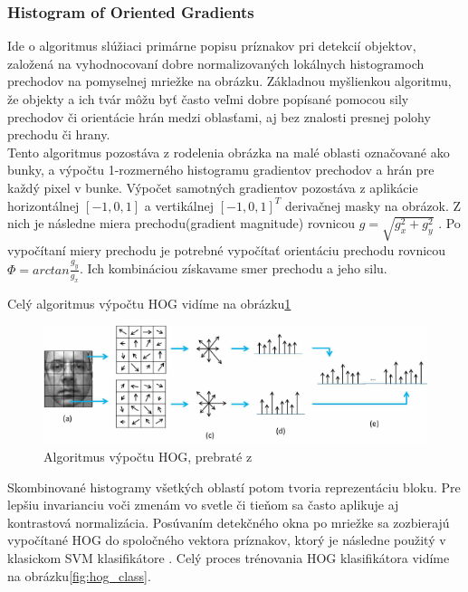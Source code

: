 \subsubsection{Histogram of Oriented Gradients}
Ide o algoritmus slúžiaci primárne popisu príznakov pri detekcií objektov, založená na vyhodnocovaní dobre normalizovaných lokálnych histogramoch prechodov na pomyselnej mriežke na obrázku.
Základnou myšlienkou algoritmu, že objekty a ich tvár môžu byť často veľmi dobre popísané pomocou sily prechodov či orientácie hrán medzi oblasťami, aj bez znalosti presnej polohy prechodu či hrany.\cite{dalal2005histograms} \\


\indent Tento algoritmus pozostáva z rodelenia obrázka na malé oblasti označované ako bunky, a výpočtu 1-rozmerného histogramu gradientov prechodov a hrán pre každý pixel v bunke\cite{dalal2005histograms}.
Výpočet samotných gradientov pozostáva z aplikácie horizontálnej $ [-1, 0, 1] $ a vertikálnej $ [-1, 0, 1]^T $ derivačnej masky na obrázok.
Z nich je následne miera prechodu(gradient magnitude) rovnicou $ g = \sqrt{g_{x}^2 + g_{y}^2}$ \cite{Histogra74}.
Po vypočítaní miery prechodu je potrebné vypočítať orientáciu prechodu rovnicou $ \Phi = arctan\frac{g_{y}}{g_{x}}$.
Ich kombináciou získavame smer prechodu a jeho silu.

Celý algoritmus výpočtu HOG vidíme na obrázku\ref{fig:hog}

\begin{figure}[H]
	\centering
	\includegraphics[width=1\linewidth]{img/hog}
	\caption{Algoritmus výpočtu HOG, prebraté z \cite{HOGextra27}}
	\label{fig:hog}
\end{figure}



\indent Skombinované histogramy všetkých oblastí potom tvoria reprezentáciu bloku.
Pre lepšiu invarianciu voči zmenám vo svetle či tieňom sa často aplikuje aj kontrastová normalizácia.
Posúvaním detekčného okna po mriežke sa zozbierajú vypočítané HOG do spoločného vektora príznakov, ktorý je následne použitý v klasickom SVM klasifikátore .
Celý proces trénovania HOG klasifikátora vidíme na obrázku\ref{fig:hog_class}.

